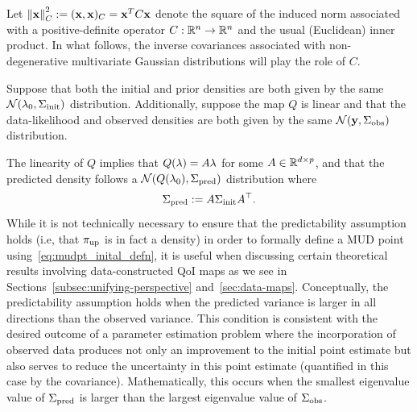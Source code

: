 Let $\left\Vert\mathbf{x}\right\Vert_C^2 := (\mathbf{x}, \mathbf{x})_C = \mathbf{x}^T C \mathbf{x} $ denote the square of the induced norm associated with a positive-definite operator $C : \mathbb{R}^n \to \mathbb{R}^n$ and the usual (Euclidean) inner product.
In what follows, the inverse covariances associated with non-degenerative multivariate Gaussian distributions will play the role of $C$.
%

Suppose that both the initial and prior densities are both given by the same $\mathcal{N}(\lambda_0, \Sigma_\text{init})$ distribution.
Additionally, suppose the map $Q$ is linear and that the data-likelihood and observed densities are both given by the same $\mathcal{N}(\mathbf{y}, \Sigma_\text{obs})$ distribution.

The linearity of $Q$ implies that $Q(\lambda)=A\lambda$ for some $A\in\mathbb{R}^{d\times p}$, and that the predicted density follows a $\mathcal{N}(Q(\lambda_0), \Sigma_\text{pred})$ distribution where
\begin{equation}\label{eq:predictCov}
	\Sigma_\text{pred} := A\Sigma_\text{init} A^\top.
\end{equation}
While it is not technically necessary to ensure that the predictability assumption holds (i.e, that $\operatorname*{\pi_{up}}$ is in fact a density) in order to formally define a MUD point using~\eqref{eq:mudpt_inital_defn}, it is useful when discussing certain theoretical results involving data-constructed QoI maps as we see in Sections~\ref{subsec:unifying-perspective} and~\ref{sec:data-maps}.
Conceptually, the predictability assumption holds when the predicted variance is larger in all directions than the observed variance.
This condition is consistent with the desired outcome of a parameter estimation problem where the incorporation of observed data produces not only an improvement to the initial point estimate but also serves to reduce the uncertainty in this point estimate (quantified in this case by the covariance).
Mathematically, this occurs when the smallest eigenvalue value of $\Sigma_\text{pred}$ is larger than the largest eigenvalue value of $\Sigma_\text{obs}$.

